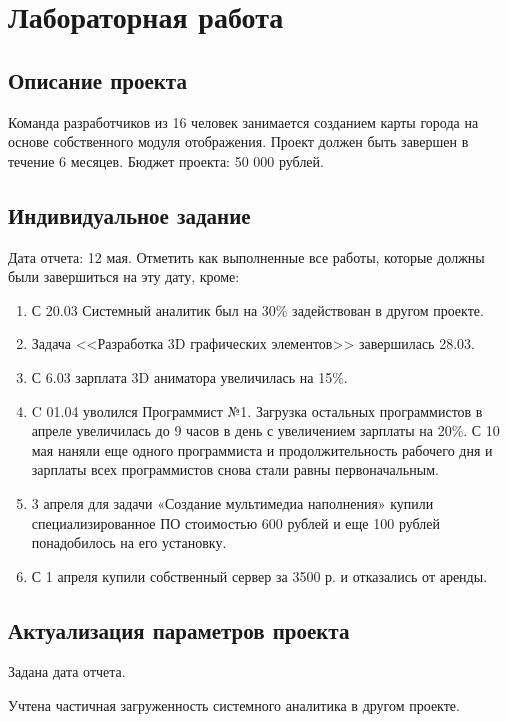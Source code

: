 \chapter{Лабораторная работа}

\section{Описание проекта}

Команда разработчиков из 16 человек занимается созданием карты города на основе собственного модуля отображения. Проект должен быть завершен в течение 6 месяцев. Бюджет проекта: 50 000 рублей.

\section{Индивидуальное задание}

Дата отчета: 12 мая.
Отметить как выполненные все работы, которые должны были завершиться на эту дату, кроме:
\begin{enumerate}
    \item С 20.03 Системный аналитик был на 30\% задействован в другом проекте.
    \item Задача <<Разработка 3D графических элементов>> завершилась 28.03.
    \item С 6.03 зарплата 3D аниматора увеличилась на 15\%.
    \item C 01.04 уволился Программист №1. Загрузка остальных программистов в апреле увеличилась до 9 часов в день с увеличением зарплаты на 20\%. С 10 мая наняли еще одного программиста и продолжительность рабочего дня и зарплаты всех программистов снова стали равны первоначальным.
    \item 3 апреля для задачи «Создание мультимедиа наполнения» купили специализированное ПО стоимостью 600 рублей и еще 100 рублей понадобилось на его установку.
    \item С 1 апреля купили собственный сервер за 3500 р. и отказались от аренды.
\end{enumerate}

\section{Актуализация параметров проекта}

Задана дата отчета.


Учтена частичная загруженность системного аналитика в другом проекте.

